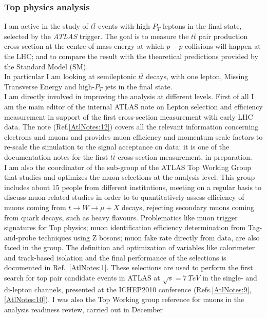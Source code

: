 \documentclass{article}
\begin{document}
\begin{vita}
\subsubsection*{Top physics analysis} 
I am active in the study of $t\bar{t}$ events with high-$P_{T}$
leptons in the final state, selected by the {\it ATLAS} trigger.  The
goal is to measure the $t\bar{t}$ pair production cross-section at the
centre-of-mass energy at which $p-p$ collisions will happen at the
LHC; and to compare the result with the theoretical predictions
provided by the Standard Model (SM). \\
In particular I am looking at semileptonic $t\bar{t}$ decays, with one
lepton, Missing Transverse Energy and high-$P_{T}$ jets in the final state. \\
I am directly involved in improving the analysis at different levels. First of all I am the main 
editor of the internal ATLAS note on Lepton selection and efficiency measurement 
in support of the first cross-section measurement with early LHC data. The note (Ref.\ref{AtlNotes:12}) covers all the relevant information concerning electrons and muons and provides muon efficiency and momentum scale factors to re-scale the simulation to the signal acceptance on data: it is one of the documentation notes for the first $t\bar{t}$ cross-section measurement, in preparation.\\
I am also the coordinator of the sub-group of the ATLAS Top Working Group
that studies and optimizes the muon selections at the analysis level. This group
includes about 15 people from different institutions, meeting on a regular basis to discuss 
muon-related studies in order to 
to quantitatively assess efficiency of muons coming from $t \rightarrow W 
\rightarrow \mu + X$ decays, rejecting secondary muons
coming from quark decays, such as heavy flavours. Problematics like muon trigger signatures for Top physics; muon identification efficiency 
determination from Tag-and-probe techniques using Z bosons; muon fake rate directly from data, are also faced in the group.
The definition and optimization of variables like calorimeter and track-based isolation
and the final performance of the selections is documented in
Ref.~\ref{AtlNotes:1}. These selections are used to perform the first search for top pair candidate events in ATLAS
 at $\sqrt{s} = 7~TeV$ in the single- and di-lepton channels, presented at the ICHEP2010 conference (Refs.\ref{AtlNotes:9},\ref{AtlNotes:10}).  
I was also the Top Working group reference for muons in the analysis readiness review, carried out in December

\end{vita}
\end{document}
